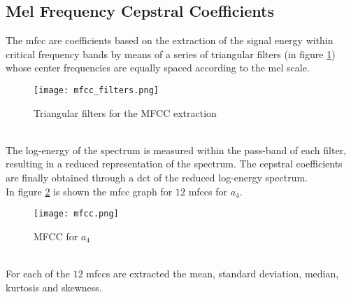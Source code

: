\subsection{Mel Frequency Cepstral Coefficients}
The \gls{mfcc} are coefficients based on the extraction of the signal energy within critical frequency bands by means of a series of triangular filters (in figure \ref{fig:mfcc_filters}) whose center frequencies are equally spaced according to the mel scale.
\begin{figure}[h]
    \centering
    \texttt{[image: mfcc\_filters.png]} 
	\caption{Triangular filters for the MFCC extraction}
    \label{fig:mfcc_filters}
\end{figure}
\\
The log-energy of the spectrum is measured within the pass-band of each filter, resulting in a reduced representation of the spectrum. The cepstral coefficients are finally obtained through a \gls{dct} of the reduced log-energy spectrum.
\\
In figure \ref{fig:mfcc} is shown the \gls{mfcc} graph for $12$ mfccs for $a_4$.
\begin{figure}[h]
    \centering
    \texttt{[image: mfcc.png]} 
	\caption{MFCC for $a_4$}
    \label{fig:mfcc}
\end{figure}
\\
For each of the $12$ \gls{mfcc}s are extracted the mean, standard deviation, median, kurtosis and skewness.

